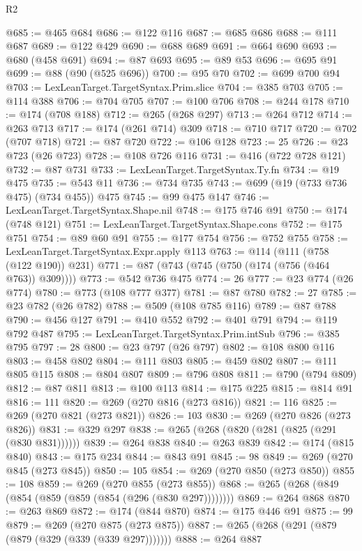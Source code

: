 \begin{lexlean}{R2}
\begin{coremodule}
{{{{{{{{{{{{{{{{{{{{{{{{{{{{{{{{{{{{{{{{{{{{{{{{{{{{{{{{{{{{{{{{{{{{{{{{{{{{{{{{{{{{{{{{{{{{{{{{{{{{{{{{{{{{{{{{{{{{{{{{{{{{{{{{{{{{{{{{{{{{@685 := @465 @684
@686 := @122 @116
@687 := @685 @686
@688 := @111 @687
@689 := @122 @429
@690 := @688 @689
@691 := @664 @690
@693 := @680 (@458 @691)
@694 := @87 @693
@695 := @89 @53
@696 := @695 @91
@699 := @88 (@90 (@525 @696))
@700 := @95 @70
@702 := @699 @700 @94
@703 := LexLeanTarget.TargetSyntax.Prim.slice
@704 := @385 @703
@705 := @114 @388
@706 := @704 @705
@707 := @100 @706
@708 := @244 @178
@710 := @174 (@708 @188)
@712 := @265 (@268 @297)
@713 := @264 @712
@714 := @263 @713
@717 := @174 (@261 @714) @309
@718 := @710 @717
@720 := @702 (@707 @718)
@721 := @87 @720
@722 := @106 @128
@723 := 25
@726 := @23 @723 (@26 @723)
@728 := @108 @726 @116
@731 := @416 (@722 @728 @121)
@732 := @87 @731
@733 := LexLeanTarget.TargetSyntax.Ty.fn
@734 := @19 @475
@735 := @543 @11
@736 := @734 @735
@743 := @699 (@19 (@733 @736 @475) (@734 @455)) @475
@745 := @99 @475 @147
@746 := LexLeanTarget.TargetSyntax.Shape.nil
@748 := @175 @746 @91
@750 := @174 (@748 @121)
@751 := LexLeanTarget.TargetSyntax.Shape.cons
@752 := @175 @751
@754 := @89 @60 @91
@755 := @177 @754
@756 := @752 @755
@758 := LexLeanTarget.TargetSyntax.Expr.apply @113
@763 := @114 (@111 (@758 (@122 @190)) @231)
@771 := @87 (@743 (@745 (@750 (@174 (@756 (@464 @763)) @309))))
@773 := @542 @736 @475
@774 := 26
@777 := @23 @774 (@26 @774)
@780 := @773 (@108 @777 @377)
@781 := @87 @780
@782 := 27
@785 := @23 @782 (@26 @782)
@788 := @509 (@108 @785 @116)
@789 := @87 @788
@790 := @456 @127
@791 := @410 @552
@792 := @401 @791
@794 := @119 @792 @487
@795 := LexLeanTarget.TargetSyntax.Prim.intSub
@796 := @385 @795
@797 := 28
@800 := @23 @797 (@26 @797)
@802 := @108 @800 @116
@803 := @458 @802
@804 := @111 @803
@805 := @459 @802
@807 := @111 @805 @115
@808 := @804 @807
@809 := @796 @808
@811 := @790 (@794 @809)
@812 := @87 @811
@813 := @100 @113
@814 := @175 @225
@815 := @814 @91
@816 := 111
@820 := @269 (@270 @816 (@273 @816))
@821 := 116
@825 := @269 (@270 @821 (@273 @821))
@826 := 103
@830 := @269 (@270 @826 (@273 @826))
@831 := @329 @297
@838 := @265 (@268 (@820 (@281 (@825 (@291 (@830 @831))))))
@839 := @264 @838
@840 := @263 @839
@842 := @174 (@815 @840)
@843 := @175 @234
@844 := @843 @91
@845 := 98
@849 := @269 (@270 @845 (@273 @845))
@850 := 105
@854 := @269 (@270 @850 (@273 @850))
@855 := 108
@859 := @269 (@270 @855 (@273 @855))
@868 := @265 (@268 (@849 (@854 (@859 (@859 (@854 (@296 (@830 @297))))))))
@869 := @264 @868
@870 := @263 @869
@872 := @174 (@844 @870)
@874 := @175 @446 @91
@875 := 99
@879 := @269 (@270 @875 (@273 @875))
@887 := @265 (@268 (@291 (@879 (@879 (@329 (@339 (@339 @297)))))))
@888 := @264 @887
}}}}}}}}}}}}}}}}}}}}}}}}}}}}}}}}}}}}}}}}}}}}}}}}}}}}}}}}}}}}}}}}}}}}}}}}}}}}}}}}}}}}}}}}}}}}}}}}}}}}}}}}}}}}}}}}}}}}}}}}}}}}}}}}}}}}}}}}}}}}
\end{coremodule}
\end{lexlean}
